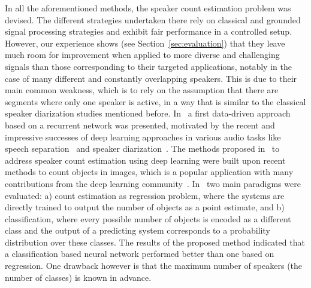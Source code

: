 \par

In all the aforementioned methods, the speaker count estimation problem was devised.
The different strategies undertaken there rely on classical and grounded signal processing strategies and exhibit fair performance in a controlled setup.
However, our experience shows (see Section~\ref{sec:evaluation}) that they leave much room for improvement when applied to more diverse and challenging signals than those corresponding to their targeted applications, notably in the case of many different and constantly overlapping speakers.
This is due to their main common weakness, which is to rely on the assumption that there are segments where only one speaker is active, in a way that is similar to the classical speaker diarization studies mentioned before.
In~\cite{stoeter17} a first data-driven approach based on a recurrent network was presented, motivated by the recent and impressive successes of deep learning approaches in various audio tasks like speech separation~\cite{yu16, hershey16, grais17} and speaker diarization~\cite{yella14, hruz16, garciaromero17}.
The methods proposed in~\cite{stoeter17} to address speaker count estimation using deep learning were built upon recent methods to count objects in images, which is a popular application with many contributions from the deep learning community~\cite{wang15, chattopadhyay17, khan16, segui15, zhang15, arteta16, marsden16, boominathan16, zhang2015salient}.
In~\cite{stoeter17} two main paradigms were evaluated: a) count estimation as regression problem, where the systems are directly trained to output the number of objects as a point estimate, and b) classification, where every possible number of objects is encoded as a different class and the output of a predicting system corresponds to a probability distribution over these classes.
The results of the proposed method indicated that a classification based neural network performed better than one based on regression.
One drawback however is that the maximum number of speakers (the number of classes) is known in advance.


\par

